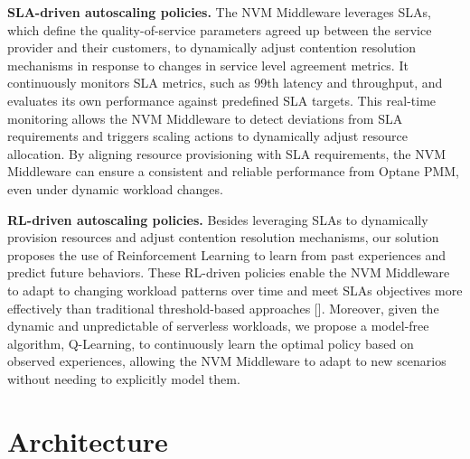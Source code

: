 \textbf{SLA-driven autoscaling policies.} The NVM Middleware leverages SLAs, which define the quality-of-service parameters agreed up between the service provider and their customers, to dynamically adjust contention resolution mechanisms in response to changes in service level agreement metrics. It continuously monitors SLA metrics, such as 99th latency and throughput, and evaluates its own performance against predefined SLA targets. This real-time monitoring allows the NVM Middleware to detect deviations from SLA requirements and triggers scaling actions to dynamically adjust resource allocation. By aligning resource provisioning with SLA requirements, the NVM Middleware can ensure a consistent and reliable performance from Optane PMM, even under dynamic workload changes.

\textbf{RL-driven autoscaling policies.} Besides leveraging SLAs to dynamically provision resources and adjust contention resolution mechanisms, our solution proposes the use of Reinforcement Learning to learn from past experiences and predict future behaviors.  These RL-driven policies enable the NVM Middleware to adapt to changing workload patterns over time and meet SLAs objectives more effectively than traditional threshold-based approaches []. Moreover, given the dynamic and unpredictable of serverless workloads, we propose a model-free algorithm, Q-Learning, to continuously learn the optimal policy based on observed experiences, allowing the NVM Middleware to adapt to new scenarios without needing to explicitly model them.

\section{Architecture}

